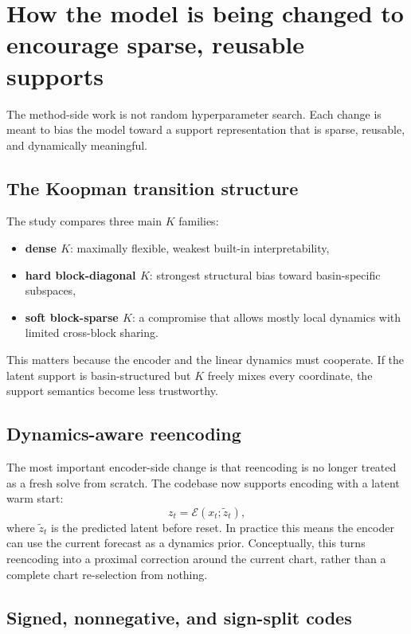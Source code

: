 \documentclass[11pt]{article}
\newcommand{\Enc}{\mathcal{E}}
\begin{document}
\section{How the model is being changed to encourage sparse, reusable supports}

The method-side work is not random hyperparameter search. Each change is meant
to bias the model toward a support representation that is sparse, reusable, and
dynamically meaningful.

\subsection{The Koopman transition structure}

The study compares three main $K$ families:
\begin{itemize}[leftmargin=1.5em]
    \item \textbf{dense $K$}: maximally flexible, weakest built-in
    interpretability,
    \item \textbf{hard block-diagonal $K$}: strongest structural bias toward
    basin-specific subspaces,
    \item \textbf{soft block-sparse $K$}: a compromise that allows mostly local
    dynamics with limited cross-block sharing.
\end{itemize}

This matters because the encoder and the linear dynamics must cooperate. If the
latent support is basin-structured but $K$ freely mixes every coordinate, the
support semantics become less trustworthy.

\subsection{Dynamics-aware reencoding}

The most important encoder-side change is that reencoding is no longer treated
as a fresh solve from scratch. The codebase now supports encoding with a latent
warm start:
\begin{equation}
    z_t = \Enc(x_t; \tilde z_t),
\end{equation}
where $\tilde z_t$ is the predicted latent before reset. In practice this means
the encoder can use the current forecast as a dynamics prior. Conceptually,
this turns reencoding into a proximal correction around the current chart,
rather than a complete chart re-selection from nothing.

\subsection{Signed, nonnegative, and sign-split codes}
\end{document}
